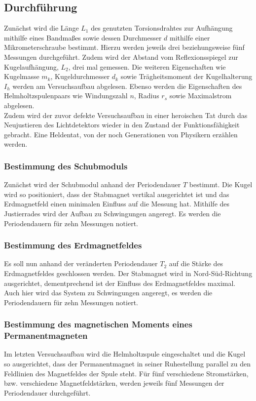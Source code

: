 \subsection{Durchführung}
Zunächst wird die Länge $L_1$ des genutzten Torsionsdrahtes zur Aufhängung mithilfe eines Bandmaßes sowie dessen Durchmesser $d$ mithilfe einer Mikrometerschraube bestimmt.
Hierzu werden jeweils drei beziehungsweise fünf Messungen durchgeführt.
Zudem wird der Abstand vom Reflexionsspiegel zur Kugelaufhängung, $L_2$, drei mal gemessen.
Die weiteren Eigenschaften wie Kugelmasse $m_k$, Kugeldurchmesser $d_k$ sowie Trägheitsmoment der Kugelhalterung $I_h$ werden am Versuchsaufbau abgelesen.
Ebenso werden die Eigenschaften des Helmholtzspulenpaars wie Windungszahl $n$, Radius $r_s$ sowie Maximalstrom abgelesen.\\
Zudem wird der zuvor defekte Versuchsaufbau in einer heroischen Tat durch das Neujustieren des Lichtdetektors wieder in den Zustand der Funktionsfähigkeit gebracht.
Eine Heldentat, von der noch Generationen von Physikern erzählen werden.\\
\subsubsection{Bestimmung des Schubmoduls}
\label{sec:d1}
Zunächst wird der Schubmodul anhand der Periodendauer $T$ bestimmt.
Die Kugel wird so positioniert, dass der Stabmagnet vertikal ausgerichtet ist und das Erdmagnetfeld einen minimalen Einfluss auf die Messung hat.
Mithilfe des Justierrades wird der Aufbau zu Schwingungen angeregt.
Es werden die Periodendauern für zehn Messungen notiert.
\subsubsection{Bestimmung des Erdmagnetfeldes}
\label{sec:d2}
Es soll nun anhand der veränderten Periodendauer $T_2$ auf die Stärke des Erdmagnetfeldes geschlossen werden.
Der Stabmagnet wird in Nord-Süd-Richtung ausgerichtet, dementprechend ist der Einfluss des Erdmagnetfeldes maximal.
Auch hier wird das System zu Schwingungen angeregt, es werden die Periodendauern für zehn Messungen notiert.
\subsubsection{Bestimmung des magnetischen Moments eines Permanentmagneten}
\label{sec:d3}
Im letzten Versuchsaufbau wird die Helmholtzspule eingeschaltet und die Kugel so ausgerichtet, dass der Permanentmagnet in seiner Ruhestellung parallel zu den Feldlinien des Magnetfeldes der Spule steht.
Für fünf verschiedene Stromstärken, bzw. verschiedene Magnetfeldstärken, werden jeweils fünf Messungen der Periodendauer durchgeführt.
